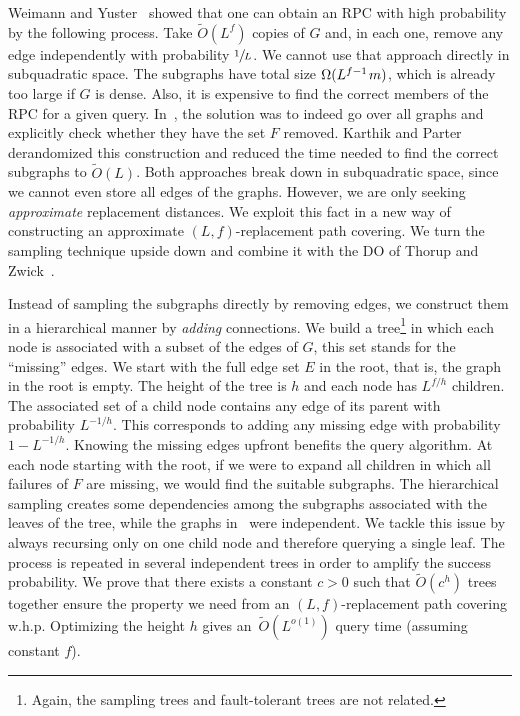\documentclass{theoretics}
\newcommand*{\Otilde}{\widetilde{O}}
\newcommand*{\nwspace}{\hspace*{.1em}}
\begin{document}
Weimann and Yuster~\cite{WY13} showed that one can obtain an RPC with high probability by the following process.
Take $\Otilde(L^f)$ copies of $G$ and,
in each one, remove any edge independently with probability $\sfrac{1}{L}$.
We cannot use that approach directly in subquadratic space.
The subgraphs have total size $\Omega(L^{f-1} \nwspace m)$, which is already too large if $G$ is dense.
Also, it is expensive to find the correct members of the RPC for a given query.
In~\cite{WY13}, the solution was to indeed go over all graphs and explicitly check
whether they have the set $F$ removed.
Karthik and Parter~\cite{KarthikParter21DeterministicRPC} derandomized this
construction and reduced the time needed to find the correct subgraphs to $\Otilde(L)$.
Both approaches break down in subquadratic space, since we cannot even store all edges of the graphs.
However, we are only seeking \emph{approximate} replacement distances.
We exploit this fact in a new way of constructing an approximate
$(L,f)$-replacement path covering.
We turn the sampling technique upside down
and combine it with the DO of Thorup and Zwick~\cite{ThorupZ05}.

Instead of sampling the subgraphs directly by removing edges,
we construct them in a hierarchical manner by \emph{adding} connections.
We build a tree\footnote{%
	Again, the sampling trees and fault-tolerant trees are not related.
} 
in which each node is associated with a subset of the edges of $G$,
this set stands for the ``missing'' edges.
We start with the full edge set $E$ in the root,
that is, the graph in the root is empty.
The height of the tree is $h$ and each node has $L^{f/h}$ children.
The associated set of a child node contains any edge of its parent with probability $L^{-1/h}$.
This corresponds to adding any missing edge with probability $1-L^{-1/h}$.
Knowing the missing edges upfront benefits the query algorithm.
At each node starting with the root, if we were to expand all children
in which all failures of $F$ are missing, we would find the suitable subgraphs.
The hierarchical sampling creates some dependencies among the subgraphs associated with 
the leaves of the tree, while the graphs in~\cite{WY13} were independent.
We tackle this issue by always recursing only on one child node
and therefore querying a single leaf.
The process is repeated in several independent trees in order to amplify the success probability.
We prove that there exists a constant $c > 0$ such that
$\Otilde(c^h)$ trees together ensure the property 
we need from an $(L,f)$-replacement path covering w.h.p.
Optimizing the height $h$ gives an~$\Otilde(L^{o(1)})$ query time (assuming constant $f$).
\end{document}
